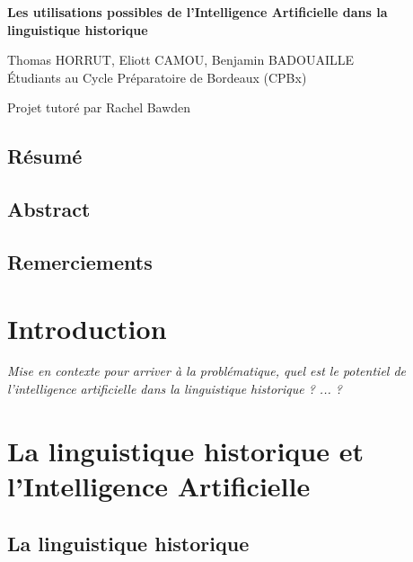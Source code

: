 \documentclass[12pt, french, twoside]{report}
\begin{document}
\begin{titlepage}
    \centering
    \vspace*{\fill}

    \huge\bfseries
    Les utilisations possibles de l'Intelligence Artificielle dans la linguistique historique
    
    \vspace*{1.5cm}
    \large Thomas HORRUT,\; Eliott CAMOU,\; Benjamin BADOUAILLE\\
    Étudiants au Cycle Préparatoire de Bordeaux (CPBx) 

    \vspace*{1.5cm}
    \large Projet tutoré par Rachel Bawden 
    
    \vspace*{\fill}
\end{titlepage}

\null
\setcounter{page}{1}
\thispagestyle{empty}
\newpage %
\section{Résumé}
\section{Abstract}
\section{Remerciements}


\tableofcontents
\listoffigures
\listoftables %

\printglossary %

\chapter{Introduction}
\textit{Mise en contexte pour arriver à la problématique, quel est le potentiel de l'intelligence artificielle dans la linguistique historique ? ... ?}

\chapter{La linguistique historique et l'Intelligence Artificielle}
\section{La linguistique historique}
\end{document}

